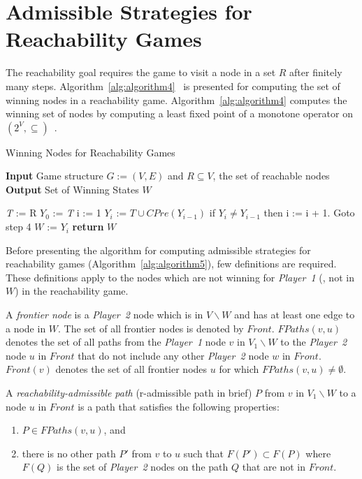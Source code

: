 \chapter{Admissible Strategies for Reachability Games}
\label{Sec:Reachability}
The reachability goal requires the game to visit a node in a set $R$
after finitely many steps. Algorithm~\ref{alg:algorithm4}~\cite{SynthesisInfiniteGames} is presented for computing the set of winning nodes in a reachability
game. Algorithm~\ref{alg:algorithm4} computes the winning set of nodes
by computing a least fixed point of a monotone operator on
$(2^{V},\subseteq)$~\cite{SynthesisInfiniteGames}.

\begin{algorithm}
	\caption{Winning Nodes for Reachability Games}
	\textbf{Input} Game structure $G := (V,E)$ and $R \subseteq V$, the set of reachable nodes \\ 
	\textbf{Output} Set of Winning States $W$
	\label{alg:algorithm4}
	\begin{algorithmic}[1]
		\STATE \textit{T} := R
		\STATE $Y_{0}$ := \textit{T}
		\STATE i := 1
		\STATE $Y_{i}$ := $\textit{T} \cup \mathit{CPre}(Y_{i-1})$
		\STATE if $Y_{i} \neq Y_{i-1}$ then i := i + 1. Goto step 4
		\STATE $W$ := $Y_{i}$
		\STATE \textbf{return} $W$
	\end{algorithmic}
\end{algorithm}

Before presenting the algorithm for computing admissible strategies for reachability games (Algorithm~\ref{alg:algorithm5}), few definitions are required. These definitions apply to the nodes which are not winning for \textit{Player~1} (\ie, not in $W$) in the reachability game.

A \textit{frontier node} is a \textit{Player~2} node which is in $V
\backslash W$ and has at least one edge to a node in $W$. The set of
all frontier nodes is denoted by $\mathit{Front}$. $\mathit{FPaths}(v,u)$
denotes the set of all paths from the \textit{Player~1} node $v$ in
$V_{1} \backslash W$ to the \textit{Player~2} node $u$ in $\mathit{Front}$ that
do not include any other \textit{Player~2} node $w$ in $\mathit{Front}$.
$\mathit{Front}(v)$ denotes the set of all frontier nodes $u$ for which
$\mathit{FPaths}(v,u) \neq \emptyset$.

A \textit{reachability-admissible path} (r-admissible path in brief) $P$ from $v$ in $V_{1} \backslash W$ to a node $u$ in $\mathit{Front}$ is a path that satisfies the following properties:
\begin{enumerate}
	\item $P \in \mathit{FPaths}(v,u)$, and
	\item there is no other path $P'$ from $v$ to $u$ such that $F(P') \subset F(P)$ where $F(Q)$ is the set of \textit{Player~2} nodes on the path $Q$ that are not in $\mathit{Front}$.
\end{enumerate}

